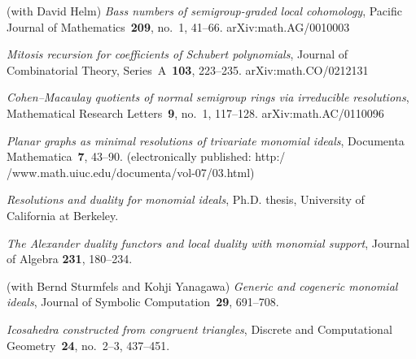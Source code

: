 \documentclass[11pt]{proposal}
\def\bibyear#1{\makebox[-1ex][l]{}\marginpar[{\flushright{\small#1}}]{}}
\begin{document}
\begin{thebibliography}{33}
\bibyear{2003}
(with David Helm) \emph{Bass numbers of semigroup-graded local
	cohomology}, Pacific Journal of Mathematics~\textbf{209},
	no.~1, 41--66.  \textsf{arXiv:math.AG/0010003}

\emph{Mitosis recursion for coefficients of Schubert polynomials},
	Journal of Combinatorial Theory, Series~A~\textbf{103},
	223--235.  \textsf{arXiv:math.CO/0212131}

\bibyear{2002}
\emph{Cohen--Macaulay quotients of normal semigroup rings via
	irreducible resolutions}, Mathematical Research
	Letters~\textbf{9}, no.~1, 117--128.
	\textsf{arXiv:math.AC/0110096}

\emph{Planar graphs as minimal resolutions of trivariate monomial
	ideals}, Documenta Mathematica~\textbf{7}, 43--90.
	(electronically published:
	\textsf{http:/$\!$/www.math.uiuc.edu/documenta/vol-07/03.html})
  

\bibyear{2000}
\emph{Resolutions and duality for monomial ideals}, Ph.D. thesis,
	University of California at Berkeley.

\emph{The Alexander duality functors and local duality with monomial
	support}, Journal of Algebra \textbf{231}, 180--234.

(with Bernd Sturmfels and Kohji Yanagawa) \emph{Generic and cogeneric
	monomial ideals}, Journal of Symbolic Computation~\textbf{29},
	691--708.

\emph{Icosahedra constructed from congruent triangles}, Discrete
	and Computational Geometry~\textbf{24}, no.~2--3, 437--451.
  



\end{thebibliography}
\end{document}
